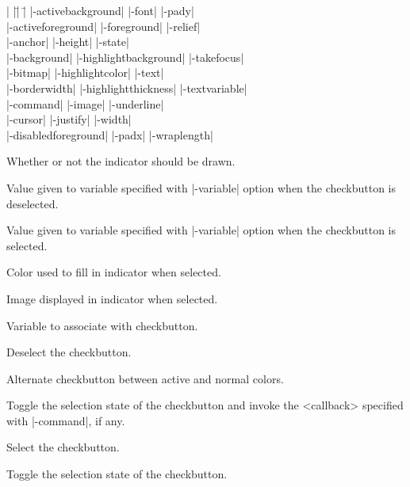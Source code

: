 \begin{tabbing}
|                   |\=|                     |\= \kill
|-activebackground| \> |-font|               \> |-pady| \\
|-activeforeground| \> |-foreground|         \> |-relief| \\
|-anchor|           \> |-height|             \> |-state| \\
|-background|       \> |-highlightbackground|\> |-takefocus| \\
|-bitmap|           \> |-highlightcolor|     \> |-text| \\        
|-borderwidth|      \> |-highlightthickness| \> |-textvariable| \\
|-command|          \> |-image|              \> |-underline| \\   
|-cursor|	    \> |-justify|            \> |-width| \\
|-disabledforeground| \> |-padx| 	     \> |-wraplength| \\
\end{tabbing}

\vskip5pt
\begin{enum}{1cm}

 Whether  or  not the indicator should be drawn.

 Value given to variable specified with |-variable|
option when the checkbutton is deselected.

 Value given to variable specified with |-variable|
option when the checkbutton is selected.

 Color used to fill in indicator when selected.

 Image displayed in indicator when selected.

 Variable to associate with checkbutton.

\end{enum}

\vskip5pt
\begin{enum}{1cm}

 Deselect the checkbutton. 

 Alternate checkbutton between 
active and normal colors.

 Toggle the selection state 
of the checkbutton and invoke the <callback> specified with |-command|, if any.

 Select the checkbutton.

 Toggle the selection state 
of the checkbutton.

\end{enum}

